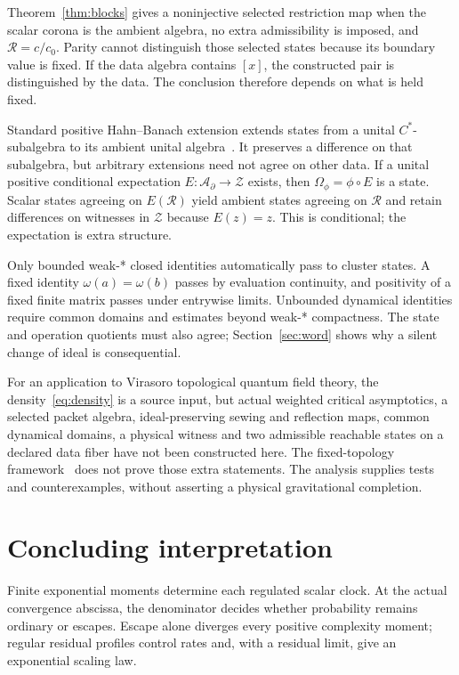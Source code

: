 \documentclass[11pt]{article}
\theoremstyle{definition}
\newcommand{\A}{\mathcal A}
\begin{document}
Theorem~\ref{thm:blocks} gives a noninjective selected restriction map when the scalar corona is the ambient algebra, no extra admissibility is imposed, and $\mathcal R=c/c_0$.
Parity cannot distinguish those selected states because its boundary value is fixed.
If the data algebra contains $[x]$, the constructed pair is distinguished by the data.
The conclusion therefore depends on what is held fixed.

Standard positive Hahn--Banach extension extends states from a unital $C^*$-subalgebra to its ambient unital algebra~\cite{Murphy1990}.
It preserves a difference on that subalgebra, but arbitrary extensions need not agree on other data.
If a unital positive conditional expectation $E:\A_\partial\to\mathcal Z$ exists, then $\Omega_\phi=\phi\circ E$ is a state.
Scalar states agreeing on $E(\mathcal R)$ yield ambient states agreeing on $\mathcal R$ and retain differences on witnesses in $\mathcal Z$ because $E(z)=z$.
This is conditional; the expectation is extra structure.

Only bounded weak-* closed identities automatically pass to cluster states.
A fixed identity $\omega(a)=\omega(b)$ passes by evaluation continuity, and positivity of a fixed finite matrix passes under entrywise limits.
Unbounded dynamical identities require common domains and estimates beyond weak-* compactness.
The state and operation quotients must also agree; Section~\ref{sec:word} shows why a silent change of ideal is consequential.

For an application to Virasoro topological quantum field theory, the density~\eqref{eq:density} is a source input, but actual weighted critical asymptotics, a selected packet algebra, ideal-preserving sewing and reflection maps, common dynamical domains, a physical witness and two admissible reachable states on a declared data fiber have not been constructed here.
The fixed-topology framework~\cite{CollierEberhardtZhang2023} does not prove those extra statements.
The analysis supplies tests and counterexamples, without asserting a physical gravitational completion.

\section{Concluding interpretation}

Finite exponential moments determine each regulated scalar clock.
At the actual convergence abscissa, the denominator decides whether probability remains ordinary or escapes.
Escape alone diverges every positive complexity moment; regular residual profiles control rates and, with a residual limit, give an exponential scaling law.
\end{document}
